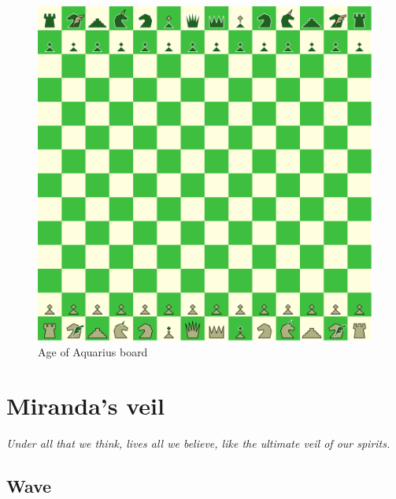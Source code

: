 \documentclass[a5paper,12pt,draft]{book} %
\begin{document}
\noindent
\begin{figure}[h]
\includegraphics[width=1.0\textwidth, keepaspectratio=true]{../gfx/boards/08_age_of_aquarius.png}
\caption{Age of Aquarius board}
\label{fig:age_of_aquarius}
\end{figure}

\clearpage

\chapter*{Miranda's veil}

\begin{flushright}
\parbox{0.8\textwidth}{
\emph{Under all that we think, lives all we believe, like the ultimate veil of our spirits. \\
 } }
\end{flushright}

\section*{Wave}
\end{document}
